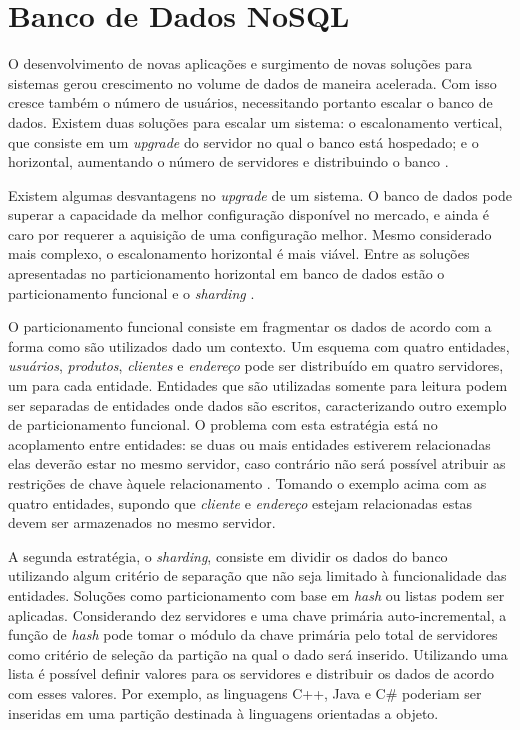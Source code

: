\graphicspath{ {4-NoSQL/} }
\chapter{Banco de Dados NoSQL}
\label{nosql}

O desenvolvimento de novas aplicações e surgimento de novas soluções 
para sistemas gerou crescimento no volume de dados de maneira acelerada. 
Com isso cresce também o número de usuários, necessitando portanto escalar 
o banco de dados. Existem duas soluções para escalar um sistema: o 
escalonamento vertical, que consiste em um \textit{upgrade} do servidor no 
qual o banco está hospedado; e o horizontal, aumentando o número de 
servidores e distribuindo o banco \cite{pritchett2008base, sharding2018educative}. 

Existem algumas desvantagens no \textit{upgrade} de um sistema. 
O banco de dados pode superar a capacidade da melhor configuração 
disponível no mercado, e ainda é caro por requerer a aquisição de 
uma configuração melhor. Mesmo considerado mais complexo, o 
escalonamento horizontal é mais viável. Entre as soluções apresentadas 
no particionamento horizontal em banco de dados estão o particionamento funcional e o 
\textit{sharding} \cite{pritchett2008base}. 

O particionamento funcional consiste em fragmentar os dados de acordo 
com a forma como são utilizados dado um contexto. Um esquema com quatro entidades, 
\textit{usuários}, \textit{produtos}, \textit{clientes} e \textit{endereço} 
pode ser distribuído em quatro servidores, 
um para cada entidade. Entidades que são utilizadas somente para leitura podem 
ser separadas de entidades onde dados são escritos, caracterizando outro 
exemplo de particionamento funcional. O problema com esta estratégia está 
no acoplamento entre entidades: se duas ou mais entidades estiverem 
relacionadas elas deverão estar no mesmo servidor, caso contrário não 
será possível atribuir as restrições de chave àquele relacionamento \cite{pritchett2008base}. 
Tomando o exemplo acima com as quatro entidades, supondo que \textit{cliente} 
e \textit{endereço} estejam relacionadas estas devem 
ser armazenados no mesmo servidor. 

A segunda estratégia, o \textit{sharding}, consiste em dividir os dados do banco 
utilizando algum critério de separação que não seja limitado à 
funcionalidade das entidades. Soluções como particionamento com base em 
\textit{hash} ou listas podem ser aplicadas. Considerando dez servidores e uma chave 
primária auto-incremental, a função de \textit{hash} pode tomar o módulo da chave 
primária pelo total de servidores como critério de seleção da partição 
na qual o dado será inserido. Utilizando uma lista é possível definir valores 
para os servidores e distribuir os dados de acordo com esses valores. 
Por exemplo, as linguagens C++, Java e C\# poderiam ser inseridas em uma 
partição destinada à linguagens orientadas a objeto.

